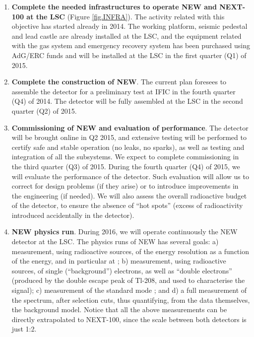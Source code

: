\begin{enumerate}
\item {\bf Complete the needed infrastructures to operate NEW and NEXT-100 at the LSC} (Figure \ref{fig.INFRA}). The activity related with this objective has started already in 2014. The working platform, seismic pedestal and lead castle are already installed at the LSC, and the equipment related with the gas system and emergency recovery system has been purchased using AdG/ERC funds and will be installed at the LSC in the first quarter (Q1) of 2015. 

\item {\bf Complete the construction of NEW}. The current plan foresees to assemble the detector for a preliminary test at IFIC in the fourth quarter (Q4) of 2014. 
%
The detector will be fully assembled at the LSC in the second quarter (Q2) of 2015. 
 
\item {\bf Commissioning of NEW and evaluation of performance}. The detector will be brought online in Q2 2015, and extensive testing will be performed to certify safe and stable operation (no leaks, no sparks), as well as testing and integration of all the subsystems. We expect to complete commissioning in the third quarter (Q3) of 2015.
During the fourth quarter (Q4) of 2015, we will evaluate the performance of the detector. Such evaluation will allow us to correct for design problems (if they arise) or to introduce improvements in the engineering (if needed). We will also assess the overall radioactive budget of the detector, to ensure the absence of ``hot spots'' (excess of radioactivity introduced accidentally in the detector). 

\item {\bf NEW physics run}. During 2016, we will operate continuously the NEW detector at the LSC. The physics runs of NEW has several goals: a) measurement, using radioactive sources, of the energy resolution as a function of the energy, and in particular at \Qbb; b) measurement, using radioactive sources, of single (``background'') electrons, as well as ``double electrons'' (produced by the double escape peak of Tl-208, and used to characterise the signal); c) measurement of the standard mode \bbtnu; and d) a full measurement of the spectrum, after selection cuts, thus quantifying, from the data themselves, the background model. Notice that all the above measurements can be directly extrapolated to NEXT-100, since the scale between both detectors is just 1:2. 
%


\end{enumerate}
